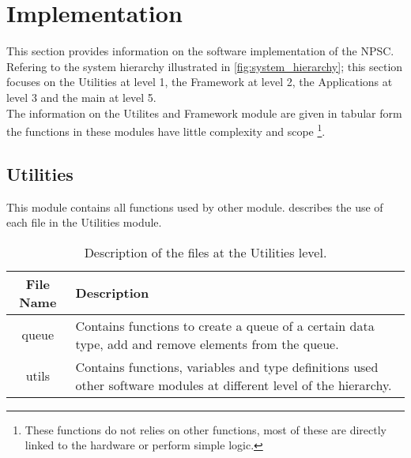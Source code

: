 \chapter{Implementation}
This section provides information on the software implementation of the NPSC. Refering to the system hierarchy illustrated in \cref{fig:system_hierarchy}; this section focuses on the Utilities at level 1, the Framework at level 2, the Applications at level 3 and the main at level 5.\\
The information on the Utilites and Framework module are given in tabular form the functions in these modules have little complexity and scope \footnote{These functions do not relies on other functions, most of these are directly linked to the hardware or perform simple logic.}. 
   
\section{Utilities}
This module contains all functions used by other module.  describes the use of each file in the Utilities module.
\begin{table}[h!]
\centering
\begin{tabular}{cp{30em}}
\hline
\hline
\toprule
\textbf{File Name} & \textbf{Description}\Tstrut \Bstrut \\
\bottomrule
\toprule
queue & Contains functions to create a queue of a certain data type, add and remove elements from the queue. \\
\midrule
utils & Contains functions, variables and type definitions used other software modules at different level of the hierarchy.\\
\bottomrule
\hline
\hline
\end{tabular}
\caption{Description of the files at the Utilities level.}
\label{table:utilities}
\end{table}
